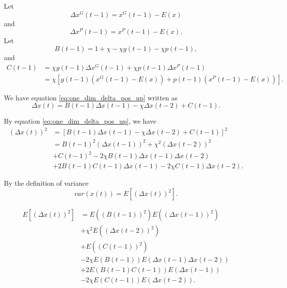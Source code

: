 \documentclass[12pt]{article}
\begin{document}
Let 
\begin{equation}
\label{eq:delta_x_g}
\Delta x^{G}(t-1) =  x^{G}(t-1) - E(x)
\end{equation}
and
\begin{equation}
\label{eq:delta_x_p}
\Delta x^{P}(t-1) =  x^{P}(t-1) - E(x).
\end{equation}
Let
\begin{equation}
\label{eq:b_t}
B(t-1) = 1 + \chi - \chi g(t-1) - \chi p(t-1),
\end{equation}
and
\begin{equation}
\label{eq:c_t}
\begin{aligned}
C(t-1) & = \chi g(t-1) \Delta x^{G}(t-1) + \chi p(t-1) \Delta x^{P}(t-1) \\
& = \chi [ g(t-1) ( x^{G}(t-1) - E(x) ) + p(t-1) ( x^{P}(t-1) - E(x) ) ].
\end{aligned}
\end{equation}

We have equation \eqref{eq:one_dim_delta_pos_up} written as
\begin{equation}
\label{eq:delta_x_1}
\Delta x(t) = B(t-1) \Delta x(t-1) - \chi \Delta x(t-2) + C(t-1) . 
\end{equation}

By equation \eqref{eq:one_dim_delta_pos_up}, we have 
\begin{equation}
\label{eq:one_dim_delta2_pos_up}
\begin{aligned}
{(\Delta x(t) )}^{2} & = [ B(t-1) \Delta x(t-1) - \chi \Delta x(t-2) + C(t-1) ]^{2}  \\
& = B(t-1)^{2} ( \Delta x(t-1) )^{2} + \chi^{2} ( \Delta x(t-2) )^{2} \\
& + C(t-1)^{2} - 2 \chi B(t-1) \Delta x(t-1) \Delta x(t-2) \\ 
& + 2 B(t-1) C(t-1) \Delta x(t-1)  - 2 \chi C(t-1) \Delta x(t-2).
\end{aligned}
\end{equation}

By the definition of variance 
\begin{equation}
\label{eq:def_var}
var(x(t)) = E[ ( \Delta x(t) )^{2} ].
\end{equation}

\begin{equation}
\label{eq:expand_var}
\begin{aligned}
E[ (\Delta x(t))^{2} ] & = E( ( B(t-1) )^{2} ) E( ( \Delta x(t-1) )^{2} ) \\
& + \chi^{2} E( ( \Delta x(t-2) )^{2} ) \\
& + E( ( C(t-1) )^{2} ) \\
& - 2 \chi E( B(t-1) ) E( \Delta x(t-1) \Delta x(t-2) ) \\
& + 2 E( B(t-1) C(t-1) ) E( \Delta x(t-1) )   \\
& - 2 \chi E( C(t-1) ) E( \Delta x(t-2) ) .
\end{aligned}
\end{equation}
\end{document}
